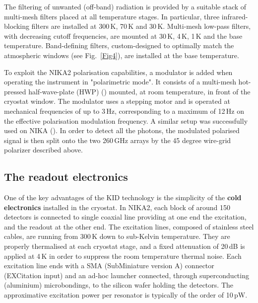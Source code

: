 \documentclass[]{aa} %
\begin{document}
The filtering of unwanted (off-band) radiation is provided by a suitable stack of multi-mesh filters placed at all temperature stages. In particular, three infrared-blocking filters are installed at 300\,K, 70\,K and 30\,K. Multi-mesh low-pass filters, with decreasing cutoff frequencies, are mounted at 30\,K, 4\,K, 1\,K and the base temperature. Band-defining filters, custom-designed to optimally match the atmospheric windows (see Fig.~\ref{Fig4}), are installed at the base temperature. 

To exploit the NIKA2 polarisation capabilities, a modulator is added when operating the instrument in "polarimetric mode". It consists of a multi-mesh hot-pressed half-wave-plate (HWP) (\cite{Pisano2008}) mounted, at room temperature, in front of the cryostat window. The modulator uses a stepping motor and is operated at mechanical frequencies of up to 3\,Hz, corresponding to a maximum of 12\,Hz on the effective polarisation modulation frequency. A similar setup was successfully used on NIKA (\cite{Ritacco2017}). In order to detect all the photons, the modulated polarised signal is then split onto the two 260\,GHz arrays by the 45 degree wire-grid polarizer described above.  


 \subsection{The readout electronics}
 \label{The readout electronics}

One of the key advantages of the KID technology is the simplicity of the {\bf{cold electronics}} installed in the cryostat.
In NIKA2, each block of around 150 detectors is connected to single coaxial line providing at one end the excitation, and the readout at the other end. The excitation lines, composed of stainless steel cables, are running from 300\,K down to sub-Kelvin temperature. They are properly thermalised at each cryostat stage, and a fixed attenuation of 20\,dB is applied at 4\,K in order to suppress the room temperature thermal noise. Each excitation line ends with a SMA (SubMiniature version A) connector (EXCitation input) and an ad-hoc launcher connected, through superconducting (aluminium) microbondings, to the silicon wafer holding the detectors. The approximative excitation power per resonator is typically of the order of 10\,pW.
\end{document}
